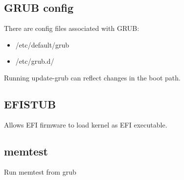 
\subsection{GRUB config}

There are config files associated with GRUB:

\begin{itemize}
  \item /etc/default/grub
  \item /etc/grub.d/
\end{itemize}

Running update-grub can reflect changes in the boot path.

\subsection{EFISTUB}

Allows EFI firmware to load kernel as EFI executable.

\subsection{memtest}

Run memtest from grub

